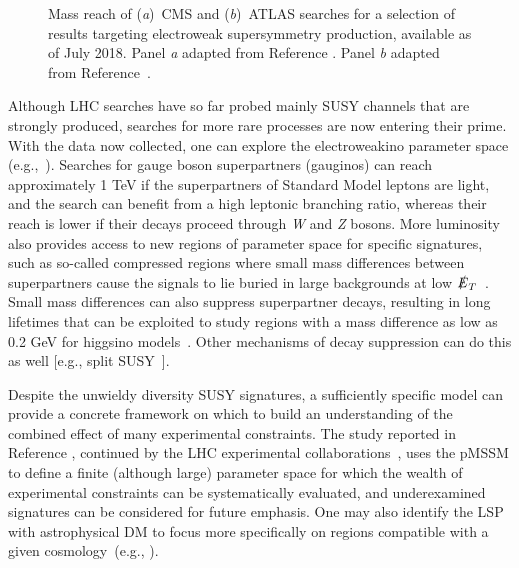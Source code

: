 \documentclass{ar-1col}
\newcommand{\MET}{\ensuremath{\slashed{E}_T}\xspace}
\begin{document}
{%
\begin{figure}[!htpb]
\caption{Mass reach of (\textit{a})\ CMS and (\textit{b})\ ATLAS searches for a selection of
results targeting electroweak supersymmetry production, available as of
July 2018.
Panel \textit{a} adapted from Reference . 
Panel \textit{b} adapted from Reference~.\label{fig:SUSYSummary_ew}}
\end{figure}

Although LHC searches have so far probed mainly  SUSY channels that are strongly produced, searches for more rare processes are now entering their prime. With the data now collected, one can explore the
electroweakino parameter space (e.g.,~). Searches for gauge
boson superpartners (gauginos) can reach approximately 1 TeV if
the superpartners of Standard Model leptons are light, and the search can
benefit from a high leptonic branching ratio, whereas their reach
is lower if their decays proceed through \textit{W} and \textit{Z} bosons. More
luminosity also provides access to new regions of parameter space
for specific signatures, such as so-called compressed regions where small
mass differences between superpartners cause the signals to lie
buried in large backgrounds at low
\MET~\cite{Aaboud:2017leg,Sirunyan:2017zss}. Small mass
differences can also suppress superpartner decays, resulting in
long lifetimes that can be exploited to study regions with a mass
difference as low as 0.2 GeV for higgsino models~\cite{ATL-PHYS-PUB-2017-019}. Other mechanisms of decay
suppression can do this as well [e.g., split
SUSY~\cite{Sirunyan:2018vjp}].

Despite the unwieldy diversity SUSY signatures, a sufficiently
specific model can provide a concrete framework on which to build
an understanding of the combined effect of many experimental
constraints. The study reported in Reference , continued by the LHC
experimental collaborations~\cite{Aad:2015baa, Khachatryan:2016nvf}, uses the
pMSSM to define a finite (although large) parameter space for
which the wealth of experimental constraints can be systematically
evaluated, and underexamined signatures can be considered for future emphasis.
One may also identify the LSP with astrophysical DM
to focus more specifically on regions compatible with a given
cosmology~(e.g., ).

}
\end{document}
